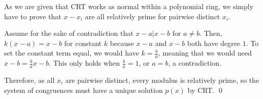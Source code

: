 \documentclass[11pt]{article}
\begin{document}
\begin{solution}
\begin{Parts}
        \Part 
        As we are given that CRT works as normal within a polynomial ring, we simply have to prove that $x - x_i$ are all relatively prime for pairwise distinct $x_i$. 
        
        Assume for the sake of contradiction that $x-a \vert x-b$ for $a \neq b$. Then, $k(x-a) = x-b$ for constant $k$ because $x-a$ and $x-b$ both have degree $1$. To set the constant term equal, we would have $k = \frac{b}{a}$, meaning that we would need $x-b = \frac{b}{a}x - b$. This only holds when $\frac{b}{a} = 1$, or $a = b$, a contradiction.
        
        Therefore, as all $x_i$ are pairwise distinct, every modulus is relatively prime, so the system of congruences must have a unique solution $p(x)$ by CRT. \qed
    \end{Parts}
\end{solution}
\end{document}
